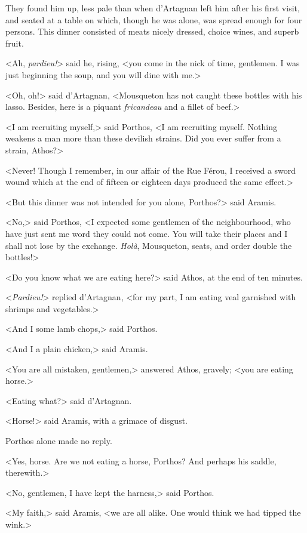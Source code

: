 They found him up, less pale than when d'Artagnan left him after his first visit, and seated at a table on which, though he was alone, was spread enough for four persons. This dinner consisted of meats nicely dressed, choice wines, and superb fruit. 

<Ah, \textit{pardieu!}> said he, rising, <you come in the nick of time, gentlemen. I was just beginning the soup, and you will dine with me.> 

<Oh, oh!> said d'Artagnan, <Mousqueton has not caught these bottles with his lasso. Besides, here is a piquant \textit{fricandeau} and a fillet of beef.> 

<I am recruiting myself,> said Porthos, <I am recruiting myself. Nothing weakens a man more than these devilish strains. Did you ever suffer from a strain, Athos?> 

<Never! Though I remember, in our affair of the Rue Férou, I received a sword wound which at the end of fifteen or eighteen days produced the same effect.> 

<But this dinner was not intended for you alone, Porthos?> said Aramis. 

<No,> said Porthos, <I expected some gentlemen of the neighbourhood, who have just sent me word they could not come. You will take their places and I shall not lose by the exchange. \textit{Holà}, Mousqueton, seats, and order double the bottles!> 

<Do you know what we are eating here?> said Athos, at the end of ten minutes. 

<\textit{Pardieu!}> replied d'Artagnan, <for my part, I am eating veal garnished with shrimps and vegetables.> 

<And I some lamb chops,> said Porthos. 

<And I a plain chicken,> said Aramis. 

<You are all mistaken, gentlemen,> answered Athos, gravely; <you are eating horse.> 

<Eating what?> said d'Artagnan. 

<Horse!> said Aramis, with a grimace of disgust. 

Porthos alone made no reply. 

<Yes, horse. Are we not eating a horse, Porthos? And perhaps his saddle, therewith.> 

<No, gentlemen, I have kept the harness,> said Porthos. 

<My faith,> said Aramis, <we are all alike. One would think we had tipped the wink.> 

